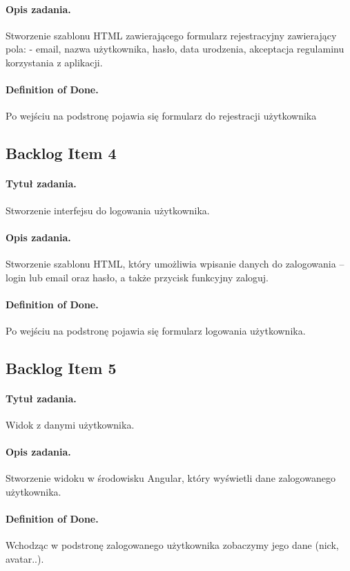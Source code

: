 ﻿\documentclass[a4paper]{article}
\begin{document}
\paragraph{Opis zadania.} Stworzenie szablonu HTML zawierającego formularz rejestracyjny zawierający pola: 
- email, nazwa użytkownika, hasło, data urodzenia, akceptacja regulaminu korzystania z aplikacji.
\paragraph{Definition of Done.} Po wejściu na podstronę pojawia się formularz do rejestracji użytkownika

 
\subsection{Backlog Item 4} 
\paragraph{Tytuł zadania.} Stworzenie interfejsu do logowania użytkownika.
\paragraph{Opis zadania.} Stworzenie szablonu HTML, który umożliwia wpisanie danych do zalogowania – login lub email oraz hasło, a także przycisk funkcyjny zaloguj.
\paragraph{Definition of Done.} Po wejściu na podstronę pojawia się formularz logowania użytkownika.

\subsection{Backlog Item 5} 
\paragraph{Tytuł zadania.} Widok z danymi użytkownika.
\paragraph{Opis zadania.} Stworzenie widoku w środowisku Angular, który wyświetli dane zalogowanego użytkownika.
\paragraph{Definition of Done.} Wchodząc w podstronę zalogowanego użytkownika zobaczymy jego dane (nick, avatar..).
\end{document}
